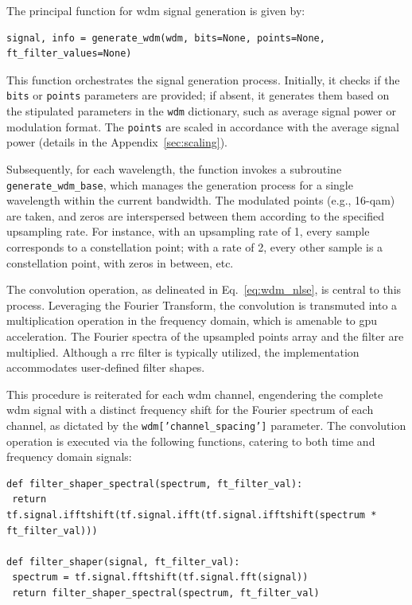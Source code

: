The principal function for \acrshort{wdm} signal generation is given by:
\begin{lstlisting}
signal, info = generate_wdm(wdm, bits=None, points=None, ft_filter_values=None)
\end{lstlisting}
This function orchestrates the signal generation process. Initially, it checks if the \texttt{bits} or \texttt{points} parameters are provided; if absent, it generates them based on the stipulated parameters in the \texttt{wdm} dictionary, such as average signal power or modulation format. The \texttt{points} are scaled in accordance with the average signal power (details in the Appendix~\ref{sec:scaling}).

Subsequently, for each wavelength, the function invokes a subroutine \texttt{generate\_wdm\_base},
which manages the generation process for a single wavelength within the current bandwidth. The modulated points (e.g., 16-\acrshort{qam}) are taken, and zeros are interspersed between them according to the specified upsampling rate. For instance, with an upsampling rate of 1, every sample corresponds to a constellation point; with a rate of 2, every other sample is a constellation point, with zeros in between, etc.

The convolution operation, as delineated in Eq.~\ref{eq:wdm_nlse}, is central to this process. Leveraging the Fourier Transform, the convolution is transmuted into a multiplication operation in the frequency domain, which is amenable to \acrshort{gpu} acceleration. The Fourier spectra of the upsampled points array and the filter are multiplied. Although a \Gls{rrc} filter is typically utilized, the implementation accommodates user-defined filter shapes.

This procedure is reiterated for each \acrshort{wdm} channel, engendering the complete \acrshort{wdm} signal with a distinct frequency shift for the Fourier spectrum of each channel, as dictated by the \texttt{wdm['channel\_spacing']} parameter. The convolution operation is executed via the following functions, catering to both time and frequency domain signals:
\begin{lstlisting}
def filter_shaper_spectral(spectrum, ft_filter_val):
 return tf.signal.ifftshift(tf.signal.ifft(tf.signal.ifftshift(spectrum * ft_filter_val)))

def filter_shaper(signal, ft_filter_val):
 spectrum = tf.signal.fftshift(tf.signal.fft(signal))
 return filter_shaper_spectral(spectrum, ft_filter_val)
\end{lstlisting}

